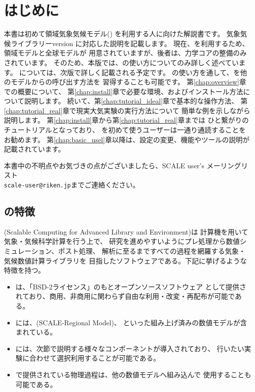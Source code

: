 \section{はじめに} \label{sec:introduction}

本書は初めて領域気象気候モデル({\scalerm})
を利用する人に向けた解説書です。
気象気候ライブラリー\scalelib  version \version に対応した説明を記載します。
現在、\scalelib を利用するため、領域モデル\scalerm と全球モデル\scalegm が
用意されていますが、後者は、力学コアの整備のみされています。
そのため、本版では、\scalerm の使い方についてのみ詳しく述べています。
\scalegm については、次版で詳しく記載される予定です。
\scalerm の使い方を通して、\scalelib を他のモデルからの呼び出す方法を
習得することも可能です。
第\ref{chap:overview}章で\scalelib の概要について、
第\ref{chap:install}章で必要な環境、およびインストール方法について説明します。
続いて、第\ref{chap:tutorial_ideal}章で基本的な操作方法、
第\ref{chap:tutorial_real}章で現実大気実験の実行方法について
簡単な例を示しながら説明します。
第\ref{chap:install}章から第\ref{chap:tutorial_real}章までは
ひと繋がりのチュートリアルとなっており、
\scalerm を初めて使うユーザーは一通り通読することをお勧めます。
第\ref{chap:basic_usel}章以降は、設定の変更、機能やツールの説明が記載されています。

本書中の不明点やお気づきの点がございましたら、SCALE user's メーリングリスト\\
 \verb|scale-user@riken.jp|までご連絡ください。



\subsection{\scalelib の特徴} \label{subsec:scale_feature}

\scalelib (Scalable Computing for Advanced Library and Environment)は
計算機を用いて気象・気候科学計算を行う上で、
研究を進めやすいようにプレ処理から数値シミュレーション、ポスト処理、
解析に至るまですべての過程を網羅する気象・気候数値計算ライブラリを
目指したソフトウェアである。下記に挙げるような特徴を持つ。
\begin{itemize}
\item \scalelib は、「BSD-2ライセンス」のもとオープンソースソフトウェア
として提供されており、商用、非商用に関わらず自由な利用・改変・再配布が可能である。
\item \scalelib には、\scalerm (SCALE-Regional Model)、
といった組み上げ済みの数値モデルが含まれている。
\item \scalelib には、次節で説明する様々なコンポーネントが導入されており、
行いたい実験に合わせて選択利用することが可能である。
\item \scalelib で提供されている物理過程は、他の数値モデルへ組み込んで
使用することも可能である。
\end{itemize}

